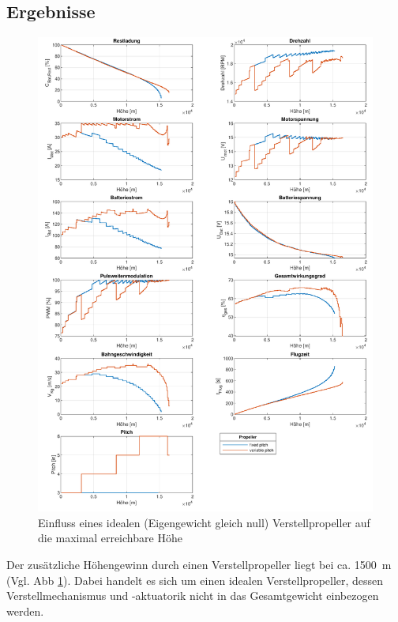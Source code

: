 \subsection{Ergebnisse}
\begin{figure}[H]
\centering
	\includegraphics[scale=0.7]{Diagramme/Verstellpropeller.pdf}
	\caption{Einfluss eines idealen (Eigengewicht gleich null) Verstellpropeller auf die maximal erreichbare Höhe}
	\label{abb:verstellpropeller}
\end{figure}
Der zusätzliche Höhengewinn durch einen Verstellpropeller liegt bei  ca. \SI{1500}{m} (Vgl. Abb \ref{abb:verstellpropeller}). Dabei handelt es sich um einen idealen Verstellpropeller, dessen Verstellmechanismus und -aktuatorik nicht in das Gesamtgewicht einbezogen werden. \\
